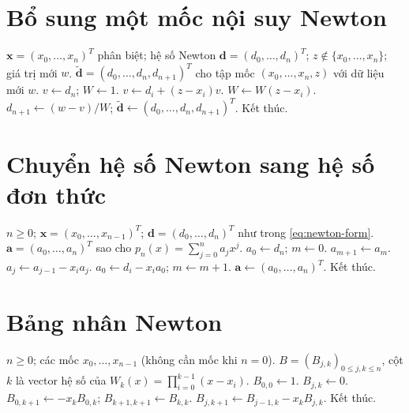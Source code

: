\documentclass[12pt,a4paper,oneside]{book}
\numberwithin{algorithm}{chapter}
\theoremstyle{definition}
\begin{document}
\section{Bổ sung một mốc nội suy Newton}
\begin{algorithm}[H]
\caption{Bổ sung mốc Newton}
\label{alg:newton-append}
\begin{algorithmic}[1]
\Require $\boldsymbol x=(x_0,\ldots,x_n)^T$ phân biệt; hệ số Newton $\boldsymbol d=(d_0,\ldots,d_n)^T$; $z\notin\{x_0,\ldots,x_n\}$; giá trị mới $w$.
\Ensure $\widetilde{\boldsymbol d}=(d_0,\ldots,d_n,d_{n+1})^T$ cho tập mốc $(x_0,\ldots,x_n,z)$ với dữ liệu mới $w$.
\State $v\gets d_n$; $W\gets1$.
 \State $v\gets d_i+(z-x_i)v$.
\EndFor
\Statex
{}
 \State $W\gets W(z-x_i)$.
\EndFor
\Statex
\State $d_{n+1}\gets(w-v)/W$; $\widetilde{\boldsymbol d}\gets(d_0,\ldots,d_n,d_{n+1})^T$.
\State Kết thúc.
\end{algorithmic}
\end{algorithm}

\section{Chuyển hệ số Newton sang hệ số đơn thức}
\begin{algorithm}[H]
\caption{Chuyển cơ sở Newton bằng Horner ngược}
\label{alg:newton-coefficients}
\begin{algorithmic}[1]
\Require $n\geq0$; $\boldsymbol x=(x_0,\ldots,x_{n-1})^T$; $\boldsymbol d=(d_0,\ldots,d_n)^T$ như trong \eqref{eq:newton-form}.
\Ensure $\boldsymbol a=(a_0,\ldots,a_n)^T$ sao cho $p_n(x)=\sum_{j=0}^{n}a_jx^j$.
\State $a_0\gets d_n$; $m\gets0$.
 \State $a_{m+1}\gets a_m$.
  \State $a_j\gets a_{j-1}-x_i a_j$.
 \EndFor
 \Statex
 \State $a_0\gets d_i-x_i a_0$; $m\gets m+1$.
\EndFor
\Statex
\State $\boldsymbol a\gets(a_0,\ldots,a_n)^T$.
\State Kết thúc.
\end{algorithmic}
\end{algorithm}

\section{Bảng nhân Newton}
\begin{algorithm}[H]
\caption{Dựng bảng nhân bằng Horner ngược}
\label{alg:newton-product-table}
\begin{algorithmic}[1]
\Require $n\geq0$; các mốc $x_0,\ldots,x_{n-1}$ (không cần mốc khi $n=0$).
\Ensure $B=(B_{j,k})_{0\leq j,k\leq n}$, cột $k$ là vector hệ số của $W_k(x)=\prod_{i=0}^{k-1}(x-x_i)$.
\State $B_{0,0}\gets1$.
  \State $B_{j,k}\gets0$.
 \EndFor
\EndFor
\Statex
{}
 \State $B_{0,k+1}\gets-x_kB_{0,k}$; $B_{k+1,k+1}\gets B_{k,k}$.
  \State $B_{j,k+1}\gets B_{j-1,k}-x_kB_{j,k}$.
 \EndFor
\EndFor
\Statex
\State Kết thúc.
\end{algorithmic}
\end{algorithm}
\end{document}
